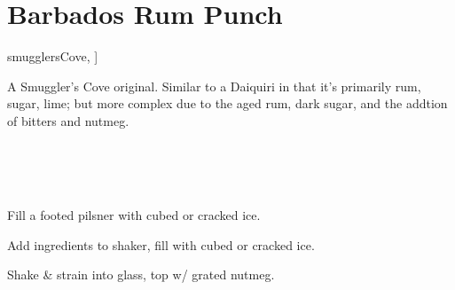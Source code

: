 \section[Barbados Rum Punch]{Barbados Rum Punch~}


\begin{recipestats}[
	servings=1,
	preptime=5~\minute,
	original=\citeauthor{smugglersCove}~\cite[p.~179]{smugglersCove},
]
\end{recipestats}

\begin{recipeabstract}
	A Smuggler's Cove original.
	Similar to a Daiquiri in that it's primarily rum, sugar, lime; but more complex due to the aged rum, dark sugar, and the addtion of bitters and nutmeg.
\end{recipeabstract}

\begin{ingredientcolumns}[1]
	\begin{ingredientblock}
		\\
		\\
		\\
	\end{ingredientblock}
\end{ingredientcolumns}


\begin{preparation}
	\item Fill a footed pilsner with cubed or cracked ice.
	\item Add ingredients to shaker, fill with cubed or cracked ice.
	\item Shake \& strain into glass, top w/ grated nutmeg.
\end{preparation}


\recipeend%

